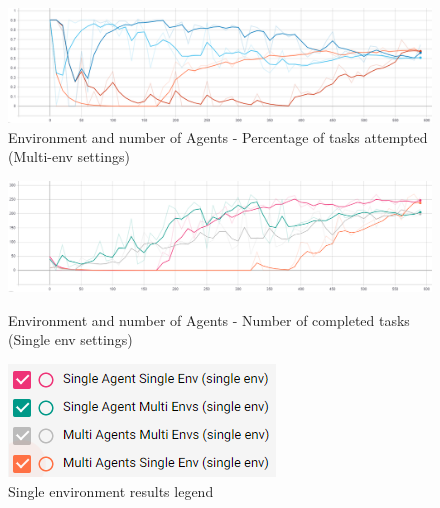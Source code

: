 \begin{figure}[H]
    \centering
    \includegraphics[width=\linewidth]{figures/5_evaluation_figs/env_agent_num_training_fig/percent_tasks.png}
    \caption{Environment and number of Agents - Percentage of tasks attempted (Multi-env settings)}
    \label{fig:env_percent_tasks}
\end{figure}

\begin{figure}[H]
    \centering
    \begin{minipage}{0.75\linewidth}
        \centering
        \includegraphics[width=\linewidth]{figures/5_evaluation_figs/env_agent_num_training_fig/single_env_num_completed_tasks.png}
        \caption{Environment and number of Agents - Number of completed tasks (Single env settings)}
        \label{fig:single_env_num_completed_tasks}
    \end{minipage}\hfill
    \begin{minipage}{0.25\linewidth}
        \centering
        \includegraphics[width=\linewidth]{figures/5_evaluation_figs/env_agent_num_training_fig/single_env_legend.png}
        \caption{Single environment results legend}
        \label{fig:single_env_legend}
    \end{minipage}
\end{figure}

